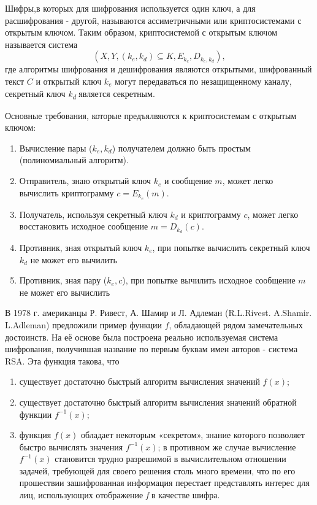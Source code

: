   Шифры,в которых для шифрования используется один ключ, а для расшифрования - другой, называются ассиметричными или криптосистемами с открытым ключом. Таким образом, криптосистемой с открытым ключом называется система 
  \begin{equation}
    (X, Y, (k_{e}, k_{d}) \subseteq K, E_{k_{e}}, D_{k_{e},k_{d}}), 
  \end{equation}
  где алгоритмы шифрования и дешифрования являются открытыми, шифрованный текст $C$ и открытый ключ $k_{e}$ могут 
передаваться по незащищенному каналу, секретный ключ \textit{k\textsubscript{d}} является секретным.

Основные требования, которые предъялвяются к криптосистемам с открытым ключом:
\begin{enumerate}
	\item Вычисление пары ($k_{e}, k_{d}$) получателем должно быть простым (полиномиальный алгоритм).
	\item Отправитель, знаю открытый ключ $k_{e}$ и сообщение $m$, может легко вычислить криптограмму 
$c = E_{k_{e}}(m)$.
	\item Получатель, используя секретный ключ $k_{d}$ и криптограмму $c$, может легко восстановить исходное сообщение 
$m = D_{k_{d}}(c)$.
	\item Противник, зная открытый ключ $k_{e}$, при попытке вычислить секретный ключ $k_{d}$ не может его 
вычилить
	\item Противник, зная пару ($k_{e}, c$), при попытке вычилить исходное сообщение $m$ не может его вычислить
\end{enumerate}

  В 1978 г. американцы Р. Ривест, А. Шамир и Л. Адлеман (R.L.Rivest. A.Shamir. L.Adleman) предложили пример функции $f$, обладающей рядом 
замечательных достоинств. На её основе была построена реально используемая система шифрования, получившая название по первым буквам имен авторов - 
система RSA. Эта функция такова, что
\begin{enumerate}
    \item существует достаточно быстрый алгоритм вычисления значений $f(x)$;
    \item существует достаточно быстрый алгоритм вычисления значений обратной функции $f^{ -1}(x)$;
    \item функция $f(x)$ обладает некоторым «секретом», знание которого позволяет быстро вычислять значения $f^{ -1}(x)$;
в противном же случае вычисление $f^{ -1}(x)$ становится трудно разрешимой в вычислительном отношении задачей, требующей для 
своего решения столь много времени, что по его прошествии зашифрованная информация перестает представлять интерес для лиц, 
использующих отображение \textit{f} в качестве шифра.
\end{enumerate}	

